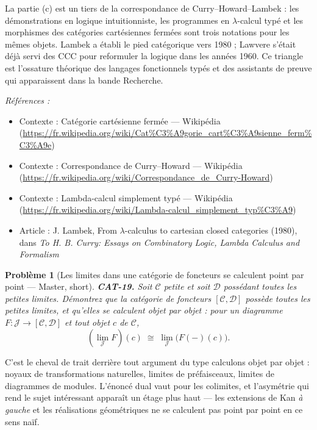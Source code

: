 \documentclass[11pt]{article}
\newtheorem{problem}{Problème}
\newenvironment{refs}{\par\small\noindent\emph{Références :}\begin{itemize}\setlength\itemsep{0pt}}{\end{itemize}\normalsize}
\begin{document}
\noindent La partie (c) est un tiers de la correspondance de Curry--Howard--Lambek : les
démonstrations en logique intuitionniste, les programmes en $\lambda$-calcul typé et les morphismes des
catégories cartésiennes fermées sont trois notations pour les mêmes objets. Lambek a établi le
pied catégorique vers 1980 ; Lawvere s'était déjà servi des CCC pour reformuler la logique dans
les années 1960. Ce triangle est l'ossature théorique des langages fonctionnels typés et des
assistants de preuve qui apparaissent dans la bande Recherche.

\begin{refs}
\item Contexte : Catégorie cartésienne fermée --- Wikipédia (\url{https://fr.wikipedia.org/wiki/Cat%C3%A9gorie_cart%C3%A9sienne_ferm%C3%A9e})
\item Contexte : Correspondance de Curry--Howard --- Wikipédia (\url{https://fr.wikipedia.org/wiki/Correspondance_de_Curry-Howard})
\item Contexte : Lambda-calcul simplement typé --- Wikipédia (\url{https://fr.wikipedia.org/wiki/Lambda-calcul_simplement_typ%C3%A9})
\item Article : J. Lambek, \og{} From $\lambda$-calculus to cartesian closed categories \fg{} (1980), dans \textit{To H. B. Curry: Essays on Combinatory Logic, Lambda Calculus and Formalism}
\end{refs}

\bigskip

\begin{problem}[{Les limites dans une catégorie de foncteurs se calculent point par point --- Master, short}]
\textbf{CAT-19.} Soit $ \mathcal{C} $ petite et soit $ \mathcal{D} $
possédant toutes les petites limites. Démontrez que la catégorie de foncteurs
$ [\mathcal{C}, \mathcal{D}] $ possède toutes les petites limites, et qu'elles se calculent
objet par objet : pour un diagramme $ F\colon \mathcal{J} \to [\mathcal{C}, \mathcal{D}] $ et
tout objet $ c $ de $ \mathcal{C} $,
\[ \left( \lim_{\mathcal{J}} F \right)(c) \;\cong\; \lim_{\mathcal{J}} \big( F(-)(c) \big). \]
\end{problem}

\noindent C'est le cheval de trait derrière tout argument du type \og{} calculons objet par
objet \fg{} : noyaux de transformations naturelles, limites de préfaisceaux, limites de diagrammes de
modules. L'énoncé dual vaut pour les colimites, et l'asymétrie qui rend le sujet intéressant
apparaît un étage plus haut --- les extensions de Kan \textit{à gauche} et les réalisations
géométriques ne se calculent pas point par point en ce sens naïf.
\end{document}
